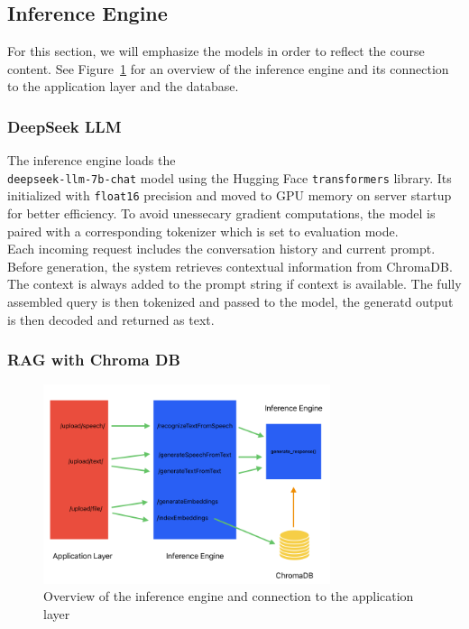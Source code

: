 \documentclass[twocolumn]{article}
\begin{document}
\subsection{Inference Engine}
For this section, we will emphasize the models in order to reflect the course content. See Figure~\ref{fig:inference} for an overview of the inference engine and its connection to the application layer and the database.

\subsubsection{DeepSeek LLM}
The inference engine loads the\\\texttt{deepseek-llm-7b-chat}\cite{deepseek7bchat} model using the Hugging Face \texttt{transformers} library. Its initialized with \texttt{float16} precision and moved to GPU memory on server startup for better efficiency. To avoid unessecary gradient computations, the model is paired with a corresponding tokenizer which is set to evaluation mode.\\
Each incoming request includes the conversation history and current prompt. Before generation, the system retrieves contextual information from ChromaDB. The context is always added to the prompt string if context is available. The fully assembled query is then tokenized and passed to the model, the generatd output is then decoded and returned as text.

\subsubsection{RAG with Chroma DB}
\begin{figure}[htb]
    \centering
    \includegraphics[width=0.75\textwidth]{imgs/inference.png}
    \caption{Overview of the inference engine and connection to the application layer}
    \label{fig:inference}
\end{figure}
\end{document}
